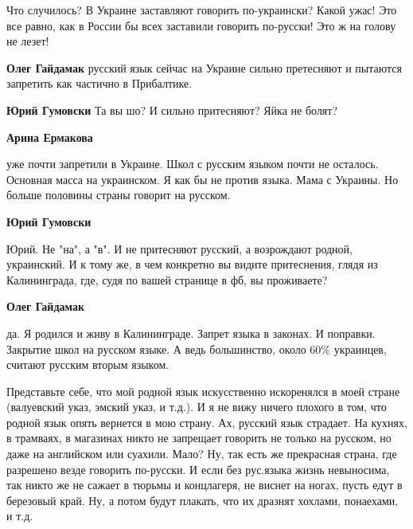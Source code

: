 Что случилось? В Украине заставляют говорить по-украински? Какой ужас! Это все
равно, как в России бы всех заставили говорить по-русски! Это ж на голову не
лезет!

\begin{itemize}

\textbf{Олег Гайдамак} русский язык сейчас на Украине сильно претесняют и пытаются запретить как частично в Прибалтике.


\textbf{Юрий Гумовски} Та вы шо? И сильно притесняют? Яйка не болят?


\textbf{Арина Ермакова} 

уже почти запретили в Украине. Школ с русским языком почти не осталось.
Основная масса на украинском. Я как бы не против языка. Мама с Украины. Но
больше половины страны говорит на русском.


\textbf{Юрий Гумовски} 

Юрий. Не "на", а "в". И не притесняют русский, а возрождают родной, украинский.
И к тому же, в чем конкретно вы видите притеснения, глядя из Калининграда, где,
судя по вашей странице в фб, вы проживаете?


\textbf{Олег Гайдамак} 

да. Я родился и живу в Калининграде. Запрет языка в
законах. И поправки. Закрытие школ на русском языке. А ведь большинство, около
60\% украинцев, считают русским вторым языком.



Представьте себе, что мой родной язык искусственно искоренялся в моей стране
(валуевский указ, эмский указ, и т.д.). И я не вижу ничего плохого в том, что
родной язык опять вернется в мою страну. Ах, русский язык страдает. На кухнях,
в трамваях, в магазинах никто не запрещает говорить не только на русском, но
даже на английском или суахили. Мало? Ну, так есть же прекрасная страна, где
разрешено везде говорить по-русски. И если без рус.языка жизнь невыносима, так
никто же не сажает в тюрьмы и концлагеря, не виснет на ногах, пусть едут в
березовый край. Ну, а потом будут плакать, что их дразнят хохлами, понаехами, и
т.д.


\end{itemize}
